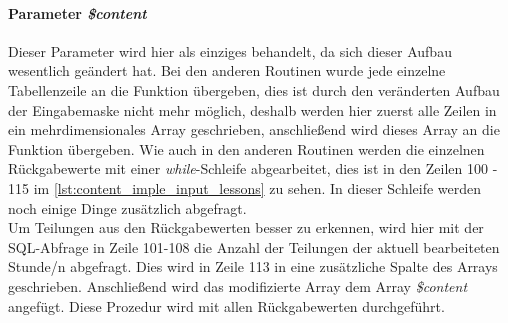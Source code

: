 \paragraph{Parameter \textit{\$content}}
Dieser Parameter wird hier als einziges behandelt, da sich dieser Aufbau wesentlich geändert hat. Bei den anderen Routinen wurde jede einzelne Tabellenzeile an die Funktion übergeben, dies ist durch den veränderten Aufbau der Eingabemaske nicht mehr möglich, deshalb werden hier zuerst alle Zeilen in ein mehrdimensionales Array geschrieben, anschließend wird dieses Array an die Funktion übergeben. Wie auch in den anderen Routinen werden die einzelnen Rückgabewerte mit einer \textit{while}-Schleife abgearbeitet, dies ist in den Zeilen 100 - 115 im \autoref{lst:content_imple_input_lessons} zu sehen. In dieser Schleife werden noch einige Dinge zusätzlich abgefragt.\\
Um Teilungen aus den Rückgabewerten besser zu erkennen, wird hier mit der SQL-Abfrage in Zeile 101-108 die Anzahl der Teilungen der aktuell bearbeiteten Stunde/n abgefragt. Dies wird in Zeile 113 in eine zusätzliche Spalte des Arrays geschrieben. Anschließend wird das modifizierte Array dem Array \textit{\$content} angefügt. Diese Prozedur wird mit allen Rückgabewerten durchgeführt.\\

